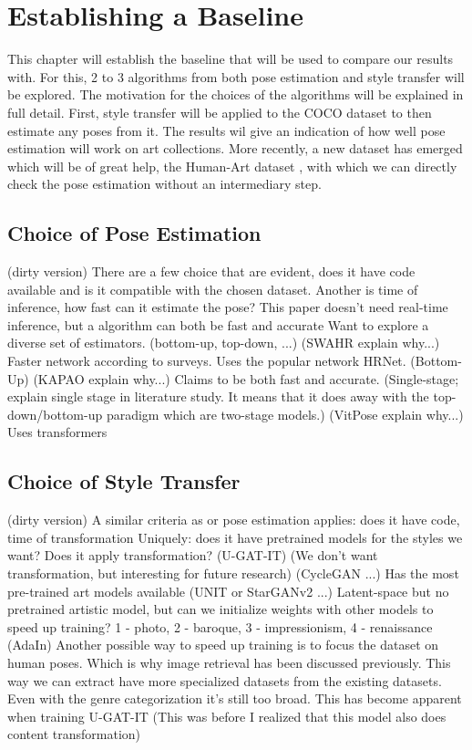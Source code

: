 \chapter{Establishing a Baseline}
\label{chap:baseline}
This chapter will establish the baseline that will be used to compare our results with.
For this, 2 to 3 algorithms from both pose estimation and style transfer will be explored.
The motivation for the choices of the algorithms will be explained in full detail.
First, style transfer will be applied to the COCO dataset to then estimate any poses from it.
The results wil give an indication of how well pose estimation will work on art collections.
More recently, a new dataset has emerged which will be of great help, the Human-Art dataset \cite{Ju2023}, with which we can directly check the pose estimation without an intermediary step.

\section{Choice of Pose Estimation}
\label{sec:baseline_pose_estimation}
(dirty version)
There are a few choice that are evident, does it have code available and is it compatible with the chosen dataset.
Another is time of inference, how fast can it estimate the pose? This paper doesn't need real-time inference, but a algorithm can both be fast and accurate \cite{William2021}
Want to explore a diverse set of estimators. (bottom-up, top-down, ...)
(SWAHR explain why...) \cite{SWARH} Faster network according to surveys. Uses the popular network HRNet. (Bottom-Up)
(KAPAO explain why...) \cite{William2021} Claims to be both fast and accurate. (Single-stage; explain single stage in literature study. It means that it does away with the top-down/bottom-up paradigm which are two-stage models.)
(VitPose explain why...) \cite{vitpose} Uses transformers

\section{Choice of Style Transfer}
\label{sec:baseline_style_transfer}
(dirty version)
A similar criteria as or pose estimation applies: does it have code, time of transformation
Uniquely: does it have pretrained models for the styles we want?
Does it apply transformation? (U-GAT-IT) (We don't want transformation, but interesting for future research)
(CycleGAN ...) \cite{Zhu2017} Has the most pre-trained art models available
(UNIT or StarGANv2 ...) \cite{Liu2017} Latent-space but no pretrained artistic model, but can we initialize weights with other models to speed up training?
1 - photo, 2 - baroque, 3 - impressionism, 4 - renaissance
(AdaIn) 
Another possible way to speed up training is to focus the dataset on human poses.
Which is why image retrieval has been discussed previously.
This way we can extract have more specialized datasets from the existing datasets.
Even with the genre categorization it's still too broad.
This has become apparent when training U-GAT-IT (This was before I realized that this model also does content transformation)

